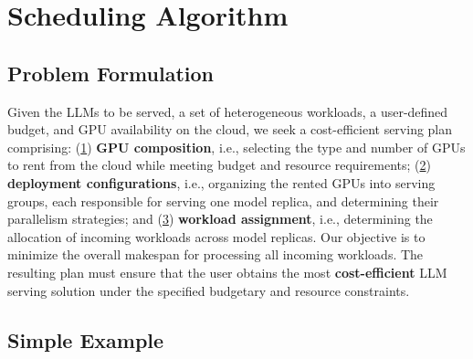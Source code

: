 \section{Scheduling Algorithm}
\label{sec:scheduling algorithm}

\subsection{Problem Formulation}
\label{sec: problem formulation}
Given the LLMs to be served, a set of heterogeneous workloads, a user-defined budget, and GPU availability on the cloud, we seek a cost-efficient serving plan comprising: (\underline{1}) \textbf{GPU composition}, i.e., selecting the type and number of GPUs to rent from the cloud while meeting budget and resource requirements; (\underline{2}) \textbf{deployment configurations}, i.e., organizing the rented GPUs into serving groups, each responsible for serving one model replica, and determining their parallelism strategies; and (\underline{3}) \textbf{workload assignment}, i.e., determining the allocation of incoming workloads across model replicas. Our objective is to minimize the overall makespan for processing all incoming workloads. The resulting plan must ensure that the user obtains the most \textbf{cost-efficient} LLM serving solution under the specified budgetary and resource constraints.



\subsection{Simple Example}

